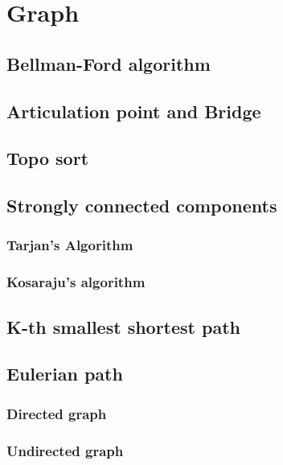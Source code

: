 \section{Graph}

\subsection{Bellman-Ford algorithm}

\subsection{Articulation point and Bridge}

\subsection{Topo sort}

\subsection{Strongly connected components}
  \subsubsection{Tarjan's Algorithm}
  \subsubsection{Kosaraju's algorithm}

\subsection{K-th smallest shortest path}

\subsection{Eulerian path}
  \subsubsection{Directed graph}

  \subsubsection{Undirected graph}

